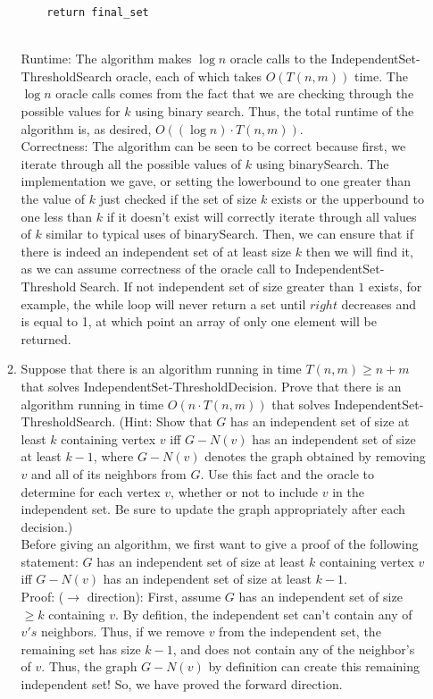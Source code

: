 \documentclass[11pt]{article}
\begin{document}
\begin{enumerate}
\begin{enumerate}
\begin{lstlisting}
    return final_set
 \end{lstlisting} \\
 
 
 Runtime: The algorithm makes $\log n$ oracle calls to the IndependentSet-ThresholdSearch oracle, each of which takes $O(T(n,m))$ time. The $\log n$ oracle calls comes from the fact that we are checking through the possible values for $k$ using binary search. Thus, the total runtime of the algorithm is, as desired, $O((\log n)\cdot T(n,m))$. \\
 
 Correctness: The algorithm can be seen to be correct because first, we iterate through all the possible values of $k$ using binarySearch. The implementation we gave, or setting the lowerbound to one greater than the value of $k$ just checked if the set of size $k$ exists or the upperbound to one less than $k$ if it doesn't exist will correctly iterate through all values of $k$ similar to typical uses of binarySearch. Then, we can ensure that if there is indeed an independent set of at least size $k$ then we will find it, as we can assume correctness of the oracle call to IndependentSet-Threshold Search. If not independent set of size greater than $1$ exists, for example, the while loop will never return a set until $right$ decreases and is equal to 1, at which point an array of only one element will be returned. 
 
 
  \item Suppose that there is an algorithm 
 running in time $T(n,m)\geq n+m$ that solves IndependentSet-ThresholdDecision.   Prove that there is an algorithm running in time $O(n\cdot T(n,m))$ that solves IndependentSet-ThresholdSearch.
(Hint: Show that $G$ has an independent set of size at least $k$ containing vertex $v$ iff $G-N(v)$ has an independent set of size at least $k-1$, where $G-N(v)$ denotes the graph obtained by removing $v$ and all of its neighbors from $G$.  Use this fact and the oracle to determine for each vertex $v$, whether or not to include $v$ in the independent set.  Be sure to update the graph appropriately after each decision.) \\

Before giving an algorithm, we first want to give a proof of the following statement: $G$ has an independent set of size at least $k$ containing vertex $v$ iff $G-N(v)$ has an independent set of size at least $k-1$. \\

Proof: ($\longrightarrow$ direction): First, assume $G$ has an independent set of size $\geq k$ containing $v$. By defition, the independent set can't contain any of $v's$ neighbors. Thus, if we remove $v$ from the independent set, the remaining set has size $k-1$, and does not contain any of the neighbor's of $v$. Thus, the graph $G - N(v)$ by definition can create this remaining independent set! So, we have proved the forward direction. \\


\end{enumerate}
\end{enumerate}
\end{document}
